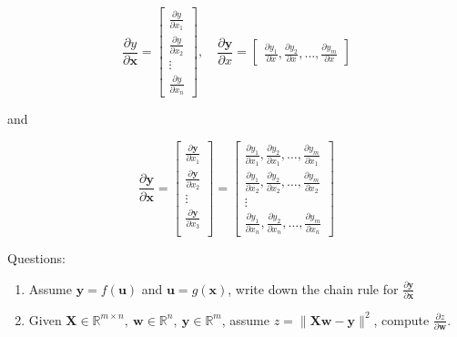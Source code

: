 \documentclass[11pt]{article}
\providecommand{\tightlist}{%
      \setlength{\itemsep}{0pt}\setlength{\parskip}{0pt}}
\begin{document}
\[
\frac{\partial y}{\partial \mathbf{x}}=\begin{bmatrix}
\frac{\partial y}{\partial x_1}\\
\frac{\partial y}{\partial x_2}\\
\vdots\\
\frac{\partial y}{\partial x_n}
\end{bmatrix},\quad 
\frac{\partial \mathbf y}{\partial {x}}=\begin{bmatrix}
\frac{\partial y_1}{\partial x}, 
\frac{\partial y_2}{\partial x}, 
\ldots,
\frac{\partial y_m}{\partial x}
\end{bmatrix}
\]

and

\[
\frac{\partial \mathbf y}{\partial \mathbf{x}}
=\begin{bmatrix}
\frac{\partial \mathbf y}{\partial {x_1}}\\
\frac{\partial \mathbf y}{\partial {x_2}}\\
\vdots\\
\frac{\partial \mathbf y}{\partial {x_3}}\\
\end{bmatrix}
=\begin{bmatrix}
\frac{\partial y_1}{\partial x_1}, 
\frac{\partial y_2}{\partial x_1},
\ldots,
\frac{\partial y_m}{\partial x_1}
\\ 
\frac{\partial y_1}{\partial x_2},
\frac{\partial y_2}{\partial x_2},
\ldots,
\frac{\partial y_m}{\partial x_2}\\ 
\vdots\\
\frac{\partial y_1}{\partial x_n},
\frac{\partial y_2}{\partial x_n},
\ldots,
\frac{\partial y_m}{\partial x_n}
\end{bmatrix}
\]

Questions:

\begin{enumerate}
\def\labelenumi{\arabic{enumi}.}
\tightlist
\item
  Assume \(\mathbf y = f(\mathbf u)\) and \(\mathbf u = g(\mathbf x)\),
  write down the chain rule for
  \(\frac {\partial\mathbf y}{\partial\mathbf x}\)
\item
  Given
  \(\mathbf X \in \mathbb R^{m\times n},\ \mathbf w \in \mathbb R^n, \ \mathbf y \in \mathbb R^m\),
  assume \(z = \| \mathbf X \mathbf w - \mathbf y\|^2\), compute
  \(\frac{\partial z}{\partial\mathbf w}\).
\end{enumerate}
\end{document}
